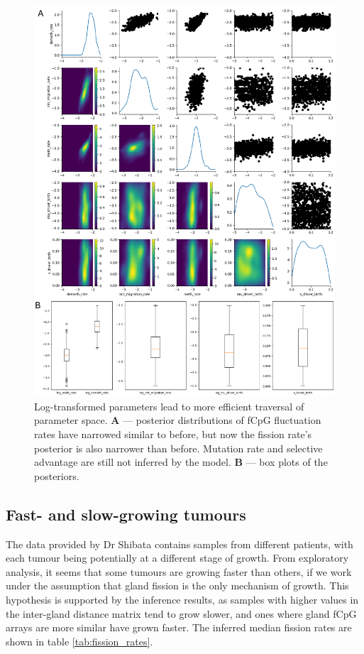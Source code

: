 \begin{figure}[h]
    \centering
    \includegraphics[width=\textwidth]{Chapter_5/figures/inference_raw/inference_2.pdf}
    \caption{Log-transformed parameters lead to more efficient traversal of
    parameter space. \textbf{A} --- posterior distributions of fCpG fluctuation
    rates have narrowed similar to before, but now the fission rate's posterior
    is also narrower than before. Mutation rate and selective advantage are
    still not inferred by the model. \textbf{B} --- box plots of the
    posteriors.}
    \label{fig:inference_2}
\end{figure}
\clearpage

\subsection{Fast- and slow-growing tumours}
The data provided by Dr Shibata contains samples from different patients, with
each tumour being potentially at a different stage of growth. From exploratory
analysis, it seems that some tumours are growing faster than others, if we work
under the assumption that gland fission is the only mechanism of growth. This
hypothesis is supported by the inference results, as samples with higher values
in the inter-gland distance matrix tend to grow slower, and ones where gland
fCpG arrays are more similar have grown faster. The inferred median fission
rates are shown in table \ref{tab:fission_rates}.

